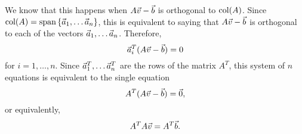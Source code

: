 \documentclass{ximera}
\begin{document}
  We know that this
  happens when $A\vec{v}-\vec{b}$ is orthogonal to $\text{col}(A)$. Since
  $\text{col}(A)=\text{span}\left\{\vec{a}_1,\ldots\vec{a}_n\right\}$, this is
  equivalent to saying that $A\vec{v}-\vec{b}$ is orthogonal to each of
  the vectors $\vec{a}_1,\ldots\vec{a}_n$. Therefore,
  \begin{equation*}
    \vec{a}_i^T(A\vec{v}-\vec{b})=0
  \end{equation*}
  for $i=1,\ldots,n$. Since $\vec{a}_1^T,\ldots\vec{a}_n^T$ are the
  rows of the matrix $A^T$, this system of $n$ equations is equivalent
  to the single equation
  \begin{equation*}
    A^T(A\vec{v}-\vec{b})=\vec{0},
  \end{equation*}
  or equivalently,
  \begin{equation*}
    A^TA\vec{v} = A^T\vec{b}.
  \end{equation*}
\end{document}
